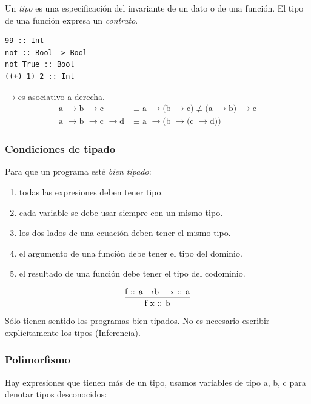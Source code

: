 \documentclass[12pt]{extarticle}
\def\flecha{$\rightarrow$}
\def\ssspace{\space\space\space}
\begin{document}
Un \textit{tipo} es una especificación del invariante de un dato o de una función. El tipo de una función expresa un \textit{contrato}.

\begin{verbatim}
99 :: Int
not :: Bool -> Bool
not True :: Bool
((+) 1) 2 :: Int
\end{verbatim}

\flecha es asociativo a derecha.
\begin{equation}
\begin{split}
\text{a \flecha b \flecha c} & \equiv \text{a \flecha (b \flecha c)} 
\not\equiv \text{(a \flecha b) \flecha c} \\
\text{a \flecha b \flecha c \flecha d} & \equiv \text{a \flecha (b \flecha (c \flecha d))}
\end{split}
\end{equation}

\subsubsection{Condiciones de tipado}
Para que un programa esté \textit{bien tipado}:

\begin{enumerate}
\itemsep-0.35em 
\item todas las expresiones deben tener tipo.
\item cada variable se debe usar siempre con un mismo tipo.
\item los dos lados de una ecuación deben tener el mismo tipo.
\item el argumento de una función debe tener el tipo del dominio.
\item el resultado de una función debe tener el tipo del codominio.
\end{enumerate}

\begin{equation}
\frac{\text{f :: a \flecha b \ssspace x :: a}}{\text{f x :: b}}
\end{equation}

Sólo tienen sentido los programas bien tipados.
No es necesario escribir explícitamente los tipos (Inferencia).

\subsubsection{Polimorfismo}
Hay expresiones que tienen más de un tipo, usamos variables de tipo a, b, c para denotar tipos desconocidos:
\end{document}
